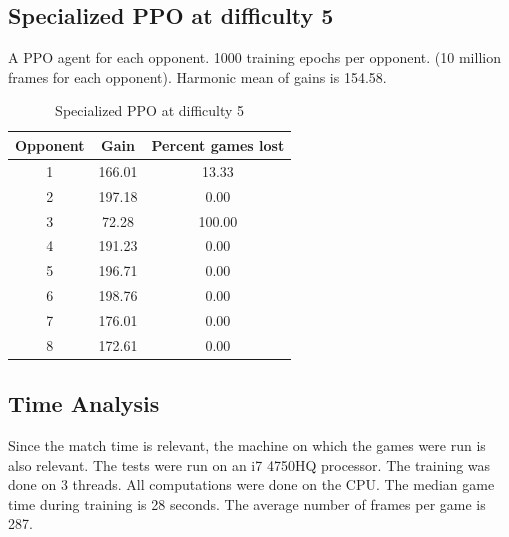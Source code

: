 \documentclass[conference]{IEEEtran}
\begin{document}
    \subsection{Specialized PPO at difficulty 5}\label{subsec:specialized-ppo-at-difficulty-5}
    A PPO agent for each opponent.
    1000 training epochs per opponent.
    (10 million frames for each opponent).
    Harmonic mean of gains is 154.58.
    \begin{table}[htbp]
        \caption{Specialized PPO at difficulty 5}
        \begin{center}
            \begin{tabular}{|c|c|c|}
                \hline
                \textbf{Opponent} & \textbf{Gain} & \textbf{Percent games lost} \\
                \hline
                1                 & 166.01        & 13.33                       \\
                2                 & 197.18        & 0.00                        \\
                3                 & 72.28         & 100.00                      \\
                4                 & 191.23        & 0.00                        \\
                5                 & 196.71        & 0.00                        \\
                6                 & 198.76        & 0.00                        \\
                7                 & 176.01        & 0.00                        \\
                8                 & 172.61        & 0.00                        \\
                \hline
            \end{tabular}
            \label{PPO generalized at difficulty 5}
        \end{center}
    \end{table}

    \subsection{Time Analysis}\label{subsec:time-analysis}
    Since the match time is relevant, the machine on which the games were run is also relevant.
    The tests were run on an i7 4750HQ processor.
    The training was done on 3 threads.
    All computations were done on the CPU\@.
    The median game time during training is 28 seconds.
    The average number of frames per game is 287.
\end{document}

